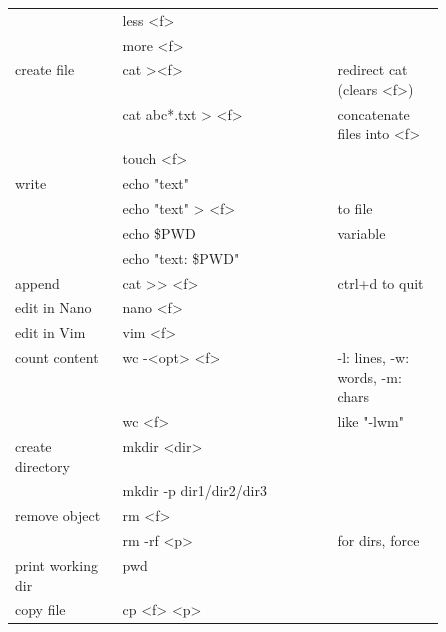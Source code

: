 {\begin{tabularx}{\linewidth}{@{} p{0.25\linewidth}>{\ttfamily}lp{0.25\linewidth} @{}}
                             & less <f>                   &                                  \\
                             & more <f>                   &                                  \\
        create file          & cat ><f>                   & redirect cat (clears <f>)        \\
                             & cat abc*.txt > <f>         & concatenate files into <f>       \\
                             & touch <f>                  &                                  \\
        write                & echo "text"                &                                  \\
                             & echo "text" > <f>          & to file                          \\
                             & echo \$PWD                 & variable                         \\
                             & echo "text: \$PWD"         &                                  \\
        append               & cat >> <f>                 & ctrl+d to quit                   \\
        edit in Nano         & nano <f>                   &                                  \\
        edit in Vim          & vim <f>                    &                                  \\
        count content        & wc -<opt> <f>              & -l: lines, -w: words, -m: chars  \\
                             & wc <f>                     & like "-lwm"                      \\
        create directory     & mkdir <dir>                &                                  \\
                             & mkdir -p dir1/dir2/dir3    &                                  \\
        remove object        & rm <f>                     &                                  \\
                             & rm -rf <p>                 & for dirs, force                  \\
        print working dir    & pwd                        &                                  \\
        copy file            & cp <f> <p>                 &                                  \\

\end{tabularx}}
